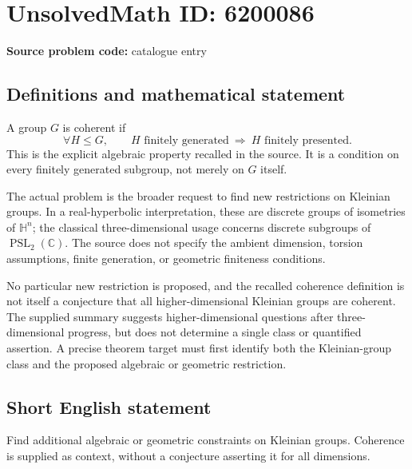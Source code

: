 \documentclass[11pt]{article}
\newcommand{\C}{\mathbb{C}}
\begin{document}
\section*{UnsolvedMath ID: 6200086}
\textbf{Source problem code:} catalogue entry
\subsection{Definitions and mathematical statement}
A group $G$ is coherent if
\[
\forall H\leq G,\qquad
H\text{ finitely generated}\ \Longrightarrow\ H\text{ finitely presented}.
\]
This is the explicit algebraic property recalled in the source. It is a condition on every finitely generated subgroup, not merely on $G$ itself.

The actual problem is the broader request to find new restrictions on Kleinian groups. In a real-hyperbolic interpretation, these are discrete groups of isometries of $\mathbb H^n$; the classical three-dimensional usage concerns discrete subgroups of $\operatorname{PSL}_2(\C)$. The source does not specify the ambient dimension, torsion assumptions, finite generation, or geometric finiteness conditions.

No particular new restriction is proposed, and the recalled coherence definition is not itself a conjecture that all higher-dimensional Kleinian groups are coherent. The supplied summary suggests higher-dimensional questions after three-dimensional progress, but does not determine a single class or quantified assertion. A precise theorem target must first identify both the Kleinian-group class and the proposed algebraic or geometric restriction.
\subsection{Short English statement}
Find additional algebraic or geometric constraints on Kleinian groups. Coherence is supplied as context, without a conjecture asserting it for all dimensions.
\end{document}
